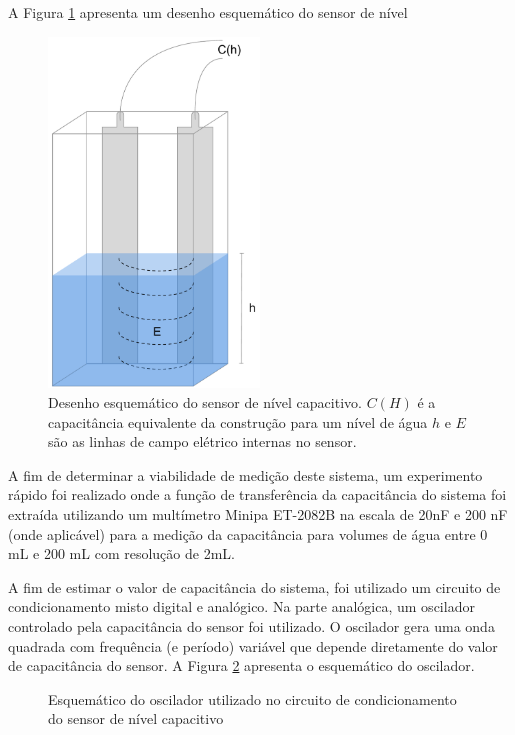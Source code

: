 \documentclass[a4paper]{instrumentacao}
\begin{document}
A Figura \ref{fig:sensor-nivel-capacitivo} apresenta um desenho esquemático do sensor de nível

\begin{figure}[H]
	\centering \includegraphics[width=0.5\textwidth]{SensorNivelCapacitivo.pdf}
	\caption{Desenho esquemático do sensor de nível capacitivo. $C(H)$ é a capacitância equivalente da construção para um nível de água $h$ e $E$ são as linhas de campo elétrico internas no sensor.}
	\label{fig:sensor-nivel-capacitivo}
\end{figure}

A fim de determinar a viabilidade de medição deste sistema, um experimento rápido foi realizado onde a função de transferência da capacitância do sistema foi extraída utilizando um multímetro Minipa ET-2082B \cite{multimetro-minipa} na escala de 20nF e 200 nF (onde aplicável) para a medição da capacitância para volumes de água entre 0 mL e 200 mL com resolução de 2mL.

A fim de estimar o valor de capacitância do sistema, foi utilizado um circuito de condicionamento misto digital e analógico. Na parte analógica, um oscilador controlado pela capacitância do sensor foi utilizado. O oscilador gera uma onda quadrada com frequência (e período) variável que depende diretamente do valor de capacitância do sensor. A Figura \ref{fig:metodologia-capacitivo-oscilador} apresenta o esquemático do oscilador.

\begin{figure}[H]
	\centering
	\caption{Esquemático do oscilador utilizado no circuito de condicionamento do sensor de nível capacitivo}
	\label{fig:metodologia-capacitivo-oscilador}
\end{figure}
\end{document}
